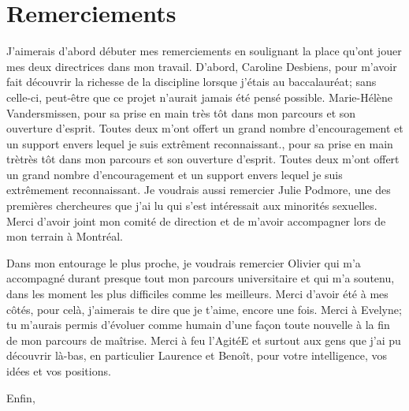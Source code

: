 \chapter*{Remerciements}         %
J'aimerais d'abord débuter mes remerciements en soulignant la place qu'ont jouer mes deux directrices dans mon travail.
D'abord, Caroline Desbiens, pour m'avoir fait découvrir la richesse de la discipline lorsque j'étais au baccalauréat; sans celle-ci, peut-être que ce projet n'aurait jamais été pensé possible.
Marie-Hélène Vandersmissen, pour sa prise en main très tôt dans mon parcours et son ouverture d'esprit.
Toutes deux m'ont offert un grand nombre d'encouragement et un support envers lequel je suis extrêment reconnaissant., pour sa prise en main trètrès tôt dans mon parcours et son ouverture d'esprit.
Toutes deux m'ont offert un grand nombre d'encouragement et un support envers lequel je suis extrêmement reconnaissant.
Je voudrais aussi remercier Julie Podmore, une des premières chercheures que j'ai lu qui s'est intéressait aux minorités sexuelles.
Merci d'avoir joint mon comité de direction et de m'avoir accompagner lors de mon terrain à Montréal.

Dans mon entourage le plus proche, je voudrais remercier Olivier qui m'a accompagné durant presque tout mon parcours universitaire et qui m'a soutenu, dans les moment les plus difficiles comme les meilleurs.
Merci d'avoir été à mes côtés, pour celà, j'aimerais te dire que je t'aime, encore une fois.
Merci à Evelyne; tu m'aurais permis d'évoluer comme humain d'une façon toute nouvelle à la fin de mon parcours de maîtrise.
Merci à feu l'AgitéE et surtout aux gens que j'ai pu découvrir là-bas, en particulier Laurence et Benoît, pour votre intelligence, vos idées et vos positions.

Enfin, 
